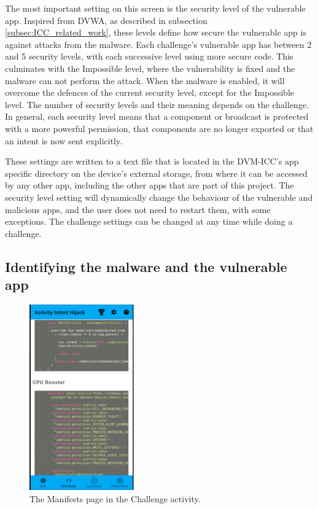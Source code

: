     The most important setting on this screen is the security level of the vulnerable app. Inspired from DVWA, as described in subsection \ref{subsec:ICC_related_work}, these levels define how secure the vulnerable app is against attacks from the malware. Each challenge's vulnerable app has between 2 and 5 security levels, with each successive level using more secure code. This culminates with the Impossible level, where the vulnerability is fixed and the malware can not perform the attack. When the malware is enabled, it will overcome the defences of the current security level, except for the Impossible level. The number of security levels and their meaning depends on the challenge. In general, each security level means that a component or broadcast is protected with a more powerful permission, that components are no longer exported or that an intent is now sent explicitly. 
    
    These settings are written to a text file that is located in the DVM-ICC's app specific directory on the device's external storage, from where it can be accessed by any other app, including the other apps that are part of this project. The security level setting will dynamically change the behaviour of the vulnerable and malicious apps, and the user does not need to restart them, with some
    exceptions. The challenge settings can be changed at any time while doing a challenge.
    
    \subsection{Identifying the malware and the vulnerable app}
        \label{subsec:identify_challenge_apps}
        
    \begin{figure}
        \centering
        \includegraphics[width=0.4\textwidth]{graphics/manifests.PNG}
        \caption{The Manifests page in the Challenge activity.}
        \label{fig:manifests_fragment}
    \end{figure}
        
